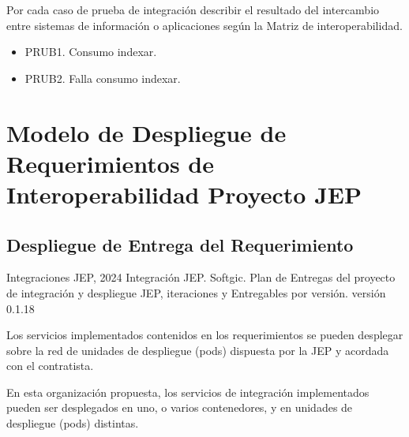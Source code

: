 \documentclass[
  paper=a4,
  ,captions=tableheading
]{scrartcl}
\providecommand{\tightlist}{%
  \setlength{\itemsep}{0pt}\setlength{\parskip}{0pt}}
\renewenvironment{quote}{\begin{customblockquote}\list{}{\rightmargin=0em\leftmargin=0em}%
\item\relax\color{blockquote-text}\ignorespaces}{\unskip\unskip\endlist\end{customblockquote}}
\begin{document}
Por cada caso de prueba de integración describir el resultado del
intercambio entre sistemas de información o aplicaciones según la Matriz
de interoperabilidad.

\begin{itemize}
\tightlist
\item
  PRUB1. Consumo indexar.
\item
  PRUB2. Falla consumo indexar.
\end{itemize}

\newpage

\section{Modelo de Despliegue de Requerimientos de Interoperabilidad
Proyecto
JEP}\label{sec:modelo-de-despliegue-de-requerimientos-de-interoperabilidad-proyecto-jep}

\subsection{Despliegue de Entrega del
Requerimiento}\label{sec:despliegue-de-entrega-del-requerimiento}

\begin{quote}
Integraciones JEP, 2024 Integración JEP. Softgic. Plan de Entregas del
proyecto de integración y despliegue JEP, iteraciones y Entregables por
versión. versión 0.1.18
\end{quote}

Los servicios implementados contenidos en los requerimientos se pueden
desplegar sobre la red de unidades de despliegue (pods) dispuesta por la
JEP y acordada con el contratista.

En esta organización propuesta, los servicios de integración
implementados pueden ser desplegados en uno, o varios contenedores, y en
unidades de despliegue (pods) distintas.
\end{document}
